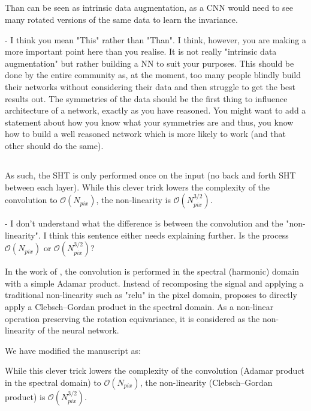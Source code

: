 \documentclass[12pt,a4paper]{article}
\newcommand{\nati}[1]{{\color[rgb]{.1,.6,.1}{NP: #1}}}
\newcommand{\todo}[1]{{\color[rgb]{.6,.1,.6}{TODO: #1}}}
\newcommand{\1}{\b{1}}              %
\newcommand{\0}{\b{0}}              %
\newcommand{\bO}{\mathcal{O}}
\begin{document}
\subsection{}
\begin{mdframed}[style=comment] 
Than can be seen as intrinsic data augmentation, as a CNN would need to see many rotated versions of the same data to learn the invariance.

- I think you mean "This" rather than "Than". I think, however, you are making a more important point here than you realise. It is not really "intrinsic data augmentation" but rather building a NN to suit your purposes. This should be done by the entire community as, at the moment, too many people blindly build their networks without considering their data and then struggle to get the best results out. The symmetries of the data should be the first thing to influence architecture of a network, exactly as you have reasoned. You might want to add a statement about how you know what your symmetries are and thus, you know how to build a well reasoned network which is more likely to work (and that other should do the same).
\end{mdframed}
\todo{Assigned: @michael}

\subsection{}
\begin{mdframed}[style=comment] 
As such, the SHT is only performed once on the input (no back and forth SHT between each layer). While this clever trick lowers the complexity of the convolution to $\mathcal{O}(N_{pix})$, the non-linearity is $\mathcal{O}(N^{3/2}_{pix})$.

- I don't understand what the difference is between the convolution and the "non-linearity". I think this sentence either needs explaining further. Is the process $\mathcal{O}(N_{pix})$ or $\mathcal{O}(N^{3/2}_{pix})$?
\end{mdframed}
In the work of \cite{kondor2018clebsch}, the convolution is performed in the spectral (harmonic) domain with a simple Adamar product. Instead of recomposing the signal and applying a traditional non-linearity such as "relu" in the pixel domain, \cite{kondor2018clebsch} proposes to directly apply a Clebsch–Gordan product in the spectral domain. As a non-linear operation preserving the rotation equivariance, it is considered as the non-linearity of the neural network.

We have modified the manuscript as:
\begin{mdframed}[style=manuscript] 
While this clever trick lowers the complexity of the convolution (Adamar product in the spectral domain) to $\bO(N_{pix})$, the non-linearity (Clebsch–Gordan product) is $\bO(N_{pix}^{3/2})$.
\end{mdframed}
\nati{Should we be clearer in the paper?}
\end{document}
